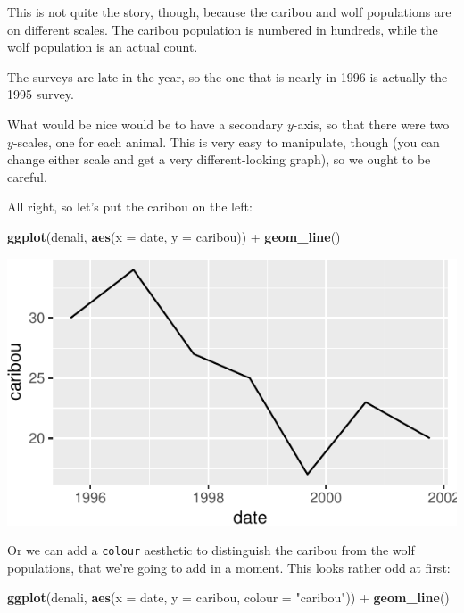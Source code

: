 \documentclass[]{tufte-book}
\newenvironment{Shaded}{}{}
\newcommand{\DataTypeTok}[1]{\textcolor[rgb]{0.56,0.13,0.00}{#1}}
\newcommand{\KeywordTok}[1]{\textcolor[rgb]{0.00,0.44,0.13}{\textbf{#1}}}
\newcommand{\NormalTok}[1]{#1}
\newcommand{\OperatorTok}[1]{\textcolor[rgb]{0.40,0.40,0.40}{#1}}
\newcommand{\StringTok}[1]{\textcolor[rgb]{0.25,0.44,0.63}{#1}}
\theoremstyle{definition}
\theoremstyle{definition}
\theoremstyle{definition}
\theoremstyle{remark}
\begin{document}
This is not quite the story, though, because the caribou and wolf
populations are on different scales. The caribou population is numbered
in hundreds, while the wolf population is an actual count.

The surveys are late in the year, so the one that is nearly in 1996 is
actually the 1995 survey.

What would be nice would be to have a secondary \(y\)-axis, so that
there were two \(y\)-scales, one for each animal. This is very easy to
manipulate, though (you can change either scale and get a very
different-looking graph), so we ought to be careful.

All right, so let's put the caribou on the left:

\begin{Shaded}
\begin{Highlighting}[]
\KeywordTok{ggplot}\NormalTok{(denali, }\KeywordTok{aes}\NormalTok{(}\DataTypeTok{x =}\NormalTok{ date, }\DataTypeTok{y =}\NormalTok{ caribou)) }\OperatorTok{+}\StringTok{ }\KeywordTok{geom_line}\NormalTok{()}
\end{Highlighting}
\end{Shaded}

\includegraphics{13-dates-and-times_files/figure-latex/unnamed-chunk-37-1}

Or we can add a \texttt{colour} aesthetic to distinguish the caribou
from the wolf populations, that we're going to add in a moment. This
looks rather odd at first:

\begin{Shaded}
\begin{Highlighting}[]
\KeywordTok{ggplot}\NormalTok{(denali, }\KeywordTok{aes}\NormalTok{(}\DataTypeTok{x =}\NormalTok{ date, }\DataTypeTok{y =}\NormalTok{ caribou, }\DataTypeTok{colour =} \StringTok{"caribou"}\NormalTok{)) }\OperatorTok{+}\StringTok{ }
\StringTok{    }\KeywordTok{geom_line}\NormalTok{()}
\end{Highlighting}
\end{Shaded}
\end{document}
